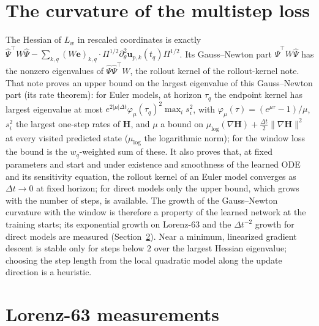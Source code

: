 \documentclass[11pt]{article}
\theoremstyle{definition}
\theoremstyle{remark}
\newcommand{\uu}{\mathbf{u}}
\newcommand{\ee}{\mathbf{e}}
\newcommand{\Hop}{\mathbf{H}}
\newcommand{\dt}{\Delta t}
\newcommand{\Psih}{\hat\Psi}
\begin{document}
\section{The curvature of the multistep loss}\label{sec:curvature}

The Hessian of $L_w$ in rescaled coordinates is exactly $\Psih^\top W\Psih-\sum_{k,q}(W\ee)_{k,q}\cdot\Pi^{1/2}\partial_\theta^2\uu_{p,k}(t_q)\Pi^{1/2}$.
Its Gauss--Newton part $\Psih^\top W\Psih$ has the nonzero eigenvalues of $\Psih\Psih^\top W$, the rollout kernel of the rollout-kernel note.
That note proves an upper bound on the largest eigenvalue of this Gauss--Newton part (its rate theorem): for Euler models, at horizon $\tau_q$ the endpoint kernel has largest eigenvalue at most $e^{2|\mu|\dt}\varphi_\mu(\tau_q)^2\max_is_i^2$, with $\varphi_\mu(\tau)=(e^{\mu\tau}-1)/\mu$, $s_i^2$ the largest one-step rates of $\Hop$, and $\mu$ a bound on $\mu_{\log}(\nabla\Hop)+\tfrac{\dt}{2}\|\nabla\Hop\|^2$ at every visited predicted state ($\mu_{\log}$ the logarithmic norm); for the window loss the bound is the $w_q$-weighted sum of these.
It also proves that, at fixed parameters and start and under existence and smoothness of the learned ODE and its sensitivity equation, the rollout kernel of an Euler model converges as $\dt\to0$ at fixed horizon; for direct models only the upper bound, which grows with the number of steps, is available.
The growth of the Gauss--Newton curvature with the window is therefore a property of the learned network at the training starts; its exponential growth on Lorenz-63 and the $\dt^{-2}$ growth for direct models are measured (Section~\ref{sec:numerics}).
Near a minimum, linearized gradient descent is stable only for steps below $2$ over the largest Hessian eigenvalue; choosing the step length from the local quadratic model along the update direction is a heuristic.

\section{Lorenz-63 measurements}\label{sec:numerics}
\end{document}

